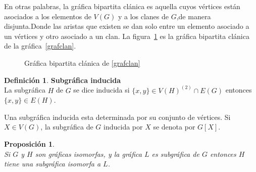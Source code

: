 \documentclass[11pt]{book}
\newtheorem{proposition}{Proposición}
\theoremstyle{definition}
\newtheorem{definition}{Definición}
\newcounter{in}
\newcounter{ini}
\begin{document}
En otras palabras, la gráfica bipartita clánica es aquella cuyos vértices están asociados a los elementos de $V(G)$ y a los clanes de $G$,de manera disjunta.Donde las aristas que existen se dan solo entre un elemento asociado a un vértices y otro asociado a un clan. La figura~\ref{BCG} es la gráfica bipartita clánica de la gráfica~\ref{grafclan}.





\begin{figure}
\centering
\caption{Gráfica bipartita clánica de \ref{grafclan}}\label{BCG}
\end{figure}






\begin{definition}\textbf{Subgráfica inducida}\\
La subgráfica $H$ de $G$ se dice inducida si $\{x,y\}\in V(H)^{(2)}\cap
E(G)$ entonces $\{x,y\}\in E(H)$.
\end{definition}

Una subgráfica inducida esta determinada por su conjunto de
vértices. Si $X\in V(G)$, la subgráfica de $G$ inducida por $X$ se
denota por $G[X]$.

\begin{proposition}\textbf{}\\
Si $G$ y $H$ son gráficas isomorfas, y la gráfica $L$ es subgráfica
de $G$ entonces $H$ tiene una subgráfica isomorfa a $L$.
\end{proposition}
\end{document}
